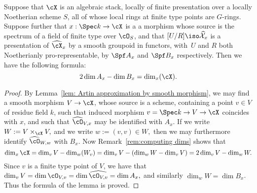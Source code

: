 \begin{alem}
  \label{lem: dimension formula}Suppose that $\cX$ is an algebraic
  stack, locally of finite presentation over a locally Noetherian
  scheme $S$, all of whose local rings at finite type points
  are $G$-rings.  Suppose further
  that $x:\Spec k\to\cX$ is a a morphism whose source is the spectrum
  of a field of finite type over $\cO_S$, and that
 $[U/R]\iso\widehat{\mathcal{X}}_x$ is a presentation of $\widehat{\cX}_x$
 by a smooth groupoid in functors,
 with~$U$ and $R$ both Noetherianly pro-representable, by
  $\Spf A_x$ and $\Spf B_x$ respectively. Then we have the following formula:
  $$2\dim A_x-\dim B_x=\dim_x(\cX).$$
\end{alem}
\begin{proof}
	By Lemma~\ref{lem: Artin approximation by smooth morphism},
	we may find a smooth morphism $V \to \cX$, whose source is a scheme,
	containing a point $v \in V$ of residue field $k$, such that induced
	morphism $v = \Spec k \to V \to \cX$ coincides with $x$,
	and such that $\widehat{\cO}_{V,x}$ may be identified with $A_x$.
	If we write $W :=  V\times_{\cX} V,$ and we write $w := (v,v) \in W,$
	then we may furthermore identify $\widehat{\cO}_{W,w}$ with $B_x$.
	Now Remark~\ref{rem:computing dims} shows that
	$$\dim_x{\cX} = \dim_v V - \dim_{w}(W_v) = \dim_v V - 
	(\dim_w W - \dim_v V) = 2\dim_v V - \dim_w W.$$
	Since $v$ is a finite type point of $V$, we have that
	$\dim_v V = \dim \cO_{V,v} = \dim \widehat{\cO_{V,v}} = \dim A_x,$
	and similarly $\dim_w W = \dim B_x$.  Thus the formula of the lemma
	is proved.
\end{proof}












